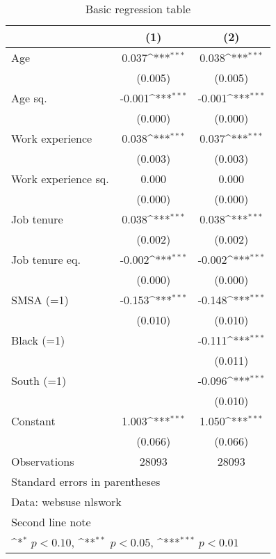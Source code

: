 \begin{table}[htbp]\centering
\def\sym#1{\ifmmode^{#1}\else\(^{#1}\)\fi}
\caption{Basic regression table \label{reg1}}
\begin{tabular}{l*{2}{c}}
\toprule
                    &\multicolumn{1}{c}{(1)}         &\multicolumn{1}{c}{(2)}         \\
\midrule
Age                 &       0.037\sym{***}&       0.038\sym{***}\\
                    &     (0.005)         &     (0.005)         \\
\addlinespace
Age sq.             &      -0.001\sym{***}&      -0.001\sym{***}\\
                    &     (0.000)         &     (0.000)         \\
\addlinespace
Work experience     &       0.038\sym{***}&       0.037\sym{***}\\
                    &     (0.003)         &     (0.003)         \\
\addlinespace
Work experience sq. &       0.000         &       0.000         \\
                    &     (0.000)         &     (0.000)         \\
\addlinespace
Job tenure          &       0.038\sym{***}&       0.038\sym{***}\\
                    &     (0.002)         &     (0.002)         \\
\addlinespace
Job tenure eq.      &      -0.002\sym{***}&      -0.002\sym{***}\\
                    &     (0.000)         &     (0.000)         \\
\addlinespace
SMSA (=1)           &      -0.153\sym{***}&      -0.148\sym{***}\\
                    &     (0.010)         &     (0.010)         \\
\addlinespace
Black (=1)          &                     &      -0.111\sym{***}\\
                    &                     &     (0.011)         \\
\addlinespace
South (=1)          &                     &      -0.096\sym{***}\\
                    &                     &     (0.010)         \\
\addlinespace
Constant            &       1.003\sym{***}&       1.050\sym{***}\\
                    &     (0.066)         &     (0.066)         \\
\midrule
Observations        &       28093         &       28093         \\
\bottomrule
\multicolumn{3}{l}{\footnotesize Standard errors in parentheses}\\
\multicolumn{3}{l}{\footnotesize Data: websuse nlswork}\\
\multicolumn{3}{l}{\footnotesize Second line note}\\
\multicolumn{3}{l}{\footnotesize \sym{*} \(p<0.10\), \sym{**} \(p<0.05\), \sym{***} \(p<0.01\)}\\
\end{tabular}
\end{table}
